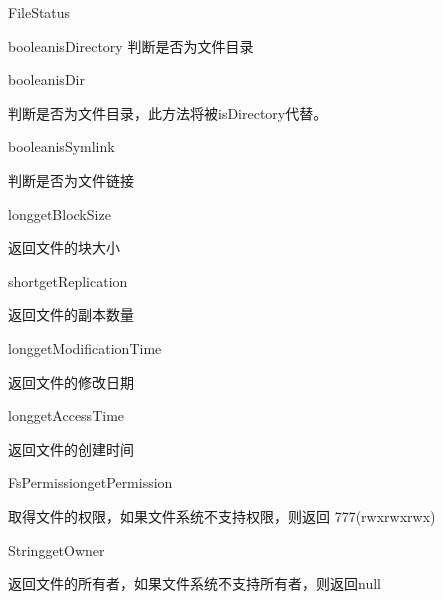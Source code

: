 \begin{XeClass}{FileStatus}
\begin{XeMethod}{\XePublic}{boolean}{isDirectory}
 判断是否为文件目录

    \end{XeMethod}

    \begin{XeMethod}{\XePublic}{boolean}{isDir}
         
 判断是否为文件目录，此方法将被isDirectory代替。

    \end{XeMethod}

    \begin{XeMethod}{\XePublic}{boolean}{isSymlink}
         
 判断是否为文件链接

    \end{XeMethod}

    \begin{XeMethod}{\XePublic}{long}{getBlockSize}
         
 返回文件的块大小

    \end{XeMethod}

    \begin{XeMethod}{\XePublic}{short}{getReplication}
         
 返回文件的副本数量

    \end{XeMethod}

    \begin{XeMethod}{\XePublic}{long}{getModificationTime}
         
 返回文件的修改日期

    \end{XeMethod}

    \begin{XeMethod}{\XePublic}{long}{getAccessTime}
         
 返回文件的创建时间

    \end{XeMethod}

    \begin{XeMethod}{\XePublic}{FsPermission}{getPermission}
         
 取得文件的权限，如果文件系统不支持权限，则返回 777(rwxrwxrwx)

    \end{XeMethod}

    \begin{XeMethod}{\XePublic}{String}{getOwner}
         
 返回文件的所有者，如果文件系统不支持所有者，则返回null


\end{XeMethod}
\end{XeClass}
